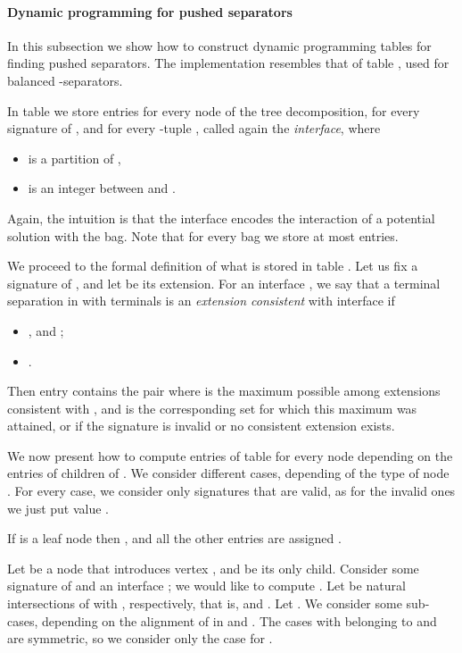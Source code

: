 \documentclass[a4paper,11pt]{article}
\theoremstyle{definition}
\theoremstyle{remark}
\begin{document}
\paragraph{Dynamic programming for pushed separators}
In this subsection we show how to construct dynamic programming tables
for finding pushed separators.  The implementation resembles that of
table , used for balanced -separators.

In table  we store entries for every node  of the tree
decomposition, for every signature  of , and for
every -tuple , called again the {\emph{interface}},
where
\begin{itemize}
\item  is a partition of ,
\item  is an integer between  and .
\end{itemize}
Again, the intuition is that the interface encodes the interaction of
a potential solution with the bag.  Note that for every bag  we
store at most  entries.

We proceed to the formal definition of what is stored in table .
Let us fix a signature  of , and let
 be its extension.  For an interface
, we say that a terminal separation  in  with terminals  is an
{\emph{extension consistent}} with interface  if
\begin{itemize}
\item ,  and ;
\item .
\end{itemize}
Then entry  contains the pair  where  is the
maximum possible  among extensions consistent with
, and  is the corresponding set  for
which this maximum was attained, or  if the signature  is
invalid or no consistent extension exists.

We now present how to compute entries of table  for every node
 depending on the entries of children of .  We consider
different cases, depending of the type of node .  For every case,
we consider only signatures that are valid, as for the invalid ones we
just put value .  

\vskip 0.3cm
 If  is a leaf node then
,
and all the other entries are assigned .  \vskip 0.3cm

 Let  be a node that
introduces vertex , and  be its only child.  Consider some
signature  of  and an interface ;
we would like to compute .  Let
 be natural intersections of  with ,
respectively, that is,  and
.  Let
.  We consider some sub-cases,
depending on the alignment of  in  and .  The cases
with  belonging to  and  are symmetric, so we consider only
the case for .
\end{document}
